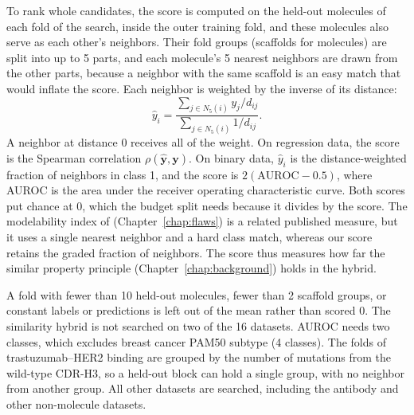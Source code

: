 To rank whole candidates, the score is computed on the held-out molecules of each fold of the search, inside the outer training fold, and these molecules also serve as each other's neighbors. Their fold groups (scaffolds for molecules) are split into up to 5 parts, and each molecule's 5 nearest neighbors are drawn from the other parts, because a neighbor with the same scaffold is an easy match that would inflate the score. Each neighbor is weighted by the inverse of its distance:
\begin{equation}
\hat{y}_i = \frac{\sum_{j\in N_5(i)} y_j / d_{ij}}{\sum_{j\in N_5(i)} 1/d_{ij}}.
\end{equation}
A neighbor at distance 0 receives all of the weight. On regression data, the score is the Spearman correlation $\rho(\hat{\mathbf{y}}, \mathbf{y})$. On binary data, $\hat{y}_i$ is the distance-weighted fraction of neighbors in class 1, and the score is $2(\mathrm{AUROC} - 0.5)$, where AUROC is the area under the receiver operating characteristic curve. Both scores put chance at 0, which the budget split needs because it divides by the score. The modelability index of \citet{Golbraikh2014} (Chapter~\ref{chap:flaws}) is a related published measure, but it uses a single nearest neighbor and a hard class match, whereas our score retains the graded fraction of neighbors. The score thus measures how far the similar property principle (Chapter~\ref{chap:background}) holds in the hybrid.

A fold with fewer than 10 held-out molecules, fewer than 2 scaffold groups, or constant labels or predictions is left out of the mean rather than scored 0. The similarity hybrid is not searched on two of the 16 datasets. AUROC needs two classes, which excludes breast cancer PAM50 subtype (4 classes). The folds of trastuzumab--HER2 binding are grouped by the number of mutations from the wild-type CDR-H3, so a held-out block can hold a single group, with no neighbor from another group. All other datasets are searched, including the antibody and other non-molecule datasets.

